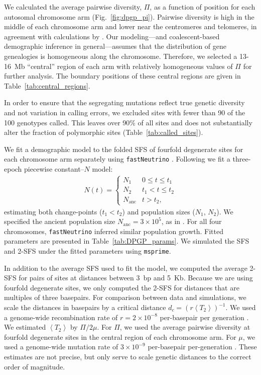 \documentclass[11pt, letterpaper]{article}   	%
\newcommand{\fig}[1]{Fig.~\ref{#1}}
\newcommand{\E}[1]{\left< #1 \right>}
\begin{document}
We calculated the average pairwise diversity, $\Pi$, as a function of position for each autosomal chromosome arm (\fig{fig:dpgp_pi}).
Pairwise diversity is high in the middle of each chromosome arm and lower near the centromeres and telomeres, in agreement with calculations by \textcite{Corbett-DetigEtAl2015}.
Our modeling---and coalescent-based demographic inference in general---assumes that the distribution of gene genealogies is homogeneous along the chromosome.
Therefore, we selected a 13-16~Mb ``central'' region of each arm with relatively homogeneous values of $\Pi$ for further analysis.
The boundary positions of these central regions are given in Table~\ref{tab:central_regions}.

In order to ensure that the segregating mutations reflect true genetic diversity and not variation in calling errors, we excluded sites with fewer than 90 of the 100 genotypes called.
This leaves over 90\% of all sites and does not substantially alter the fraction of polymorphic sites (Table~\ref{tab:called_sites}).

We fit a demographic model to the folded SFS of fourfold degenerate sites for each chromosome arm separately using \texttt{fastNeutrino} \autocite{BhaskarEtAl2015}.
Following \textcite{RagsdaleGutenkunst2017} we fit a three-epoch piecewise constant--$N$ model:
\begin{align}
    N(t) = \begin{cases}
                N_1 & 0 \leq t \leq t_1 \\
                N_2 & t_1 <  t \leq t_2 \\
                N_{\text{anc}} & t > t_2,
            \end{cases}
    \label{eq:piecewise}
\end{align}
estimating both change-points ($t_1 < t_2$) and population sizes ($N_1$, $N_2$).
We specified the ancient population size $N_{\text{anc}} = 3\times 10^5$, as in \textcite{RagsdaleGutenkunst2017}.
For all four chromosomes, \texttt{fastNeutrino} inferred similar population growth.
Fitted parameters are presented in Table~\ref{tab:DPGP_params}.
We simulated the SFS and 2-SFS under the fitted parameters using \texttt{msprime}.

In addition to the average SFS used to fit the model, we computed the average 2-SFS for pairs of sites at distances between 3~bp and 5~Kb.
Because we are using fourfold degenerate sites, we only computed the 2-SFS for distances that are multiples of three basepairs.
For comparison between data and simulations, we scale the distances in basepairs by a critical distance $d_c = (r\E{T_2})^{-1}$.
We used a genome-wide recombination rate of $r = 2 \times 10^{-8}$ per-basepair per generation \autocite{ComeronEtAl2012}.
We estimated $\E{T_2}$ by $\Pi / 2 \mu$.
For $\Pi$, we used the average pairwise diversity at fourfold degenerate sites in the central region of each chromosome arm.
For $\mu$, we used a genome-wide mutation rate of $3 \times 10^{-9}$ per-basepair per-generation \autocite{KeightleyEtAl2014}.
These estimates are not precise, but only serve to scale genetic distances to the correct order of magnitude.
\end{document}
